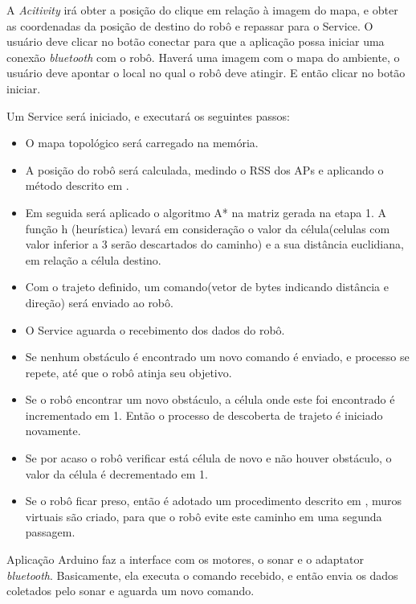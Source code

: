 \documentclass[12pt]{article}
\begin{document}
	A \textit{Acitivity} irá obter a posição do clique em relação à imagem do mapa, e obter as coordenadas da posição de destino
	 do robô e repassar para o Service. O usuário deve clicar no botão conectar para que a aplicação possa iniciar uma conexão \textit{bluetooth} com o robô.
	Haverá uma imagem com o mapa do ambiente, o usuário deve apontar o local no qual o robô deve atingir. E então clicar no botão iniciar.
	
	Um Service será iniciado, e executará os seguintes passos:
	\begin{itemize}
	  \item O mapa topológico será carregado na memória.
	  \item A posição do robô será calculada, medindo o RSS\cite{wifiRss} dos APs e aplicando o método descrito em \cite{wifiRadar}.
	  \item Em seguida será aplicado o algoritmo A*\cite{aestrela} na matriz gerada na etapa 1. A função h (heurística) levará em consideração o valor da 
	célula(celulas com valor inferior a 3 serão descartados do caminho) e a sua distância euclidiana, em relação a célula destino. 
	  \item Com o trajeto definido, um comando(vetor de bytes indicando distância e direção) será enviado ao robô.
	  \item O Service aguarda o recebimento dos dados do robô.
	  \item Se nenhum obstáculo é encontrado um novo comando é enviado, e processo se repete, até que o robô atinja seu objetivo.
	  \item Se o robô encontrar um novo obstáculo, a célula onde este foi encontrado é incrementado em 1. 
	  Então o processo de descoberta de trajeto é iniciado novamente.
	  \item Se por acaso o robô verificar está célula de novo e não houver obstáculo, o valor da célula é decrementado em 1.
	  \item Se o robô ficar preso, então é adotado um procedimento descrito em \cite{dlite},
	  muros virtuais são criado, para que o robô evite este caminho em uma segunda passagem.
	\end{itemize}
	
	 Aplicação Arduino faz a interface com os motores, o sonar e o adaptator \textit{bluetooth}.
	 Basicamente, ela executa o comando recebido, e então envia os dados coletados pelo sonar e aguarda um novo comando.
 
\clearpage
\end{document}
